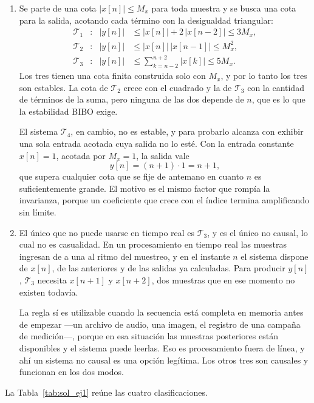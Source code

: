 \documentclass[10pt,a4paper]{article}
\begin{document}
\begin{enumerate}
		\item Se parte de una cota $|x[n]| \le M_x$ para toda
		muestra y se busca una cota para la salida, acotando cada término con la desigualdad
		triangular:
		\[
			\begin{aligned}
			\mathcal{T}_1&: & |y[n]| &\le |x[n]| + 2\,|x[n-2]| \le 3M_x, \\
			\mathcal{T}_2&: & |y[n]| &\le |x[n]|\,|x[n-1]| \le M_x^2, \\
			\mathcal{T}_3&: & |y[n]| &\le \sum_{k=n-2}^{n+2} |x[k]| \le 5M_x.
			\end{aligned}
		\]
		Los tres tienen una cota finita construida solo con $M_x$, y por lo tanto los tres
		son estables. La cota de $\mathcal{T}_2$ crece con el cuadrado y la de
		$\mathcal{T}_3$ con la cantidad de términos de la suma, pero ninguna de las dos
		depende de $n$, que es lo que la estabilidad BIBO exige.

		El sistema $\mathcal{T}_4$, en cambio, no es estable, y para probarlo alcanza con
		exhibir una sola entrada acotada cuya salida no lo esté. Con la entrada constante
		$x[n]=1$, acotada por $M_x=1$, la salida vale
		\[
			y[n] = (n+1)\cdot 1 = n+1,
		\]
		que supera cualquier cota que se fije de antemano en cuanto $n$ es suficientemente
		grande. El motivo es el mismo factor que rompía la invarianza, porque un coeficiente
		que crece con el índice termina amplificando sin límite.

		\item El único que no puede usarse en tiempo
		real es $\mathcal{T}_3$, y es el único no causal, lo cual no es casualidad. En un
		procesamiento en tiempo real las muestras ingresan de a una al ritmo del muestreo, y
		en el instante $n$ el sistema dispone de $x[n]$, de las anteriores y de las salidas
		ya calculadas. Para producir $y[n]$, $\mathcal{T}_3$ necesita $x[n+1]$ y $x[n+2]$,
		dos muestras que en ese momento no existen todavía.

		La regla sí es utilizable cuando la secuencia está completa en memoria antes de
		empezar ---un archivo de audio, una imagen, el registro de una campaña de
		medición---, porque en esa situación las muestras posteriores están disponibles y el
		sistema puede leerlas. Eso es procesamiento fuera de línea, y ahí un sistema no
		causal es una opción legítima. Los otros tres son causales y funcionan en los dos
		modos.
	\end{enumerate}

	La Tabla~\ref{tab:sol_ej1} reúne las cuatro clasificaciones.
\end{document}
